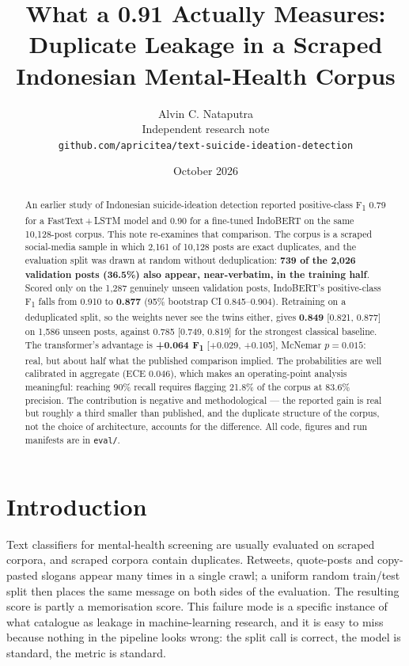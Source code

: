 \documentclass[10pt,a4paper]{article}
\title{\vspace{-2.2em}What a 0.91 \fone{} Actually Measures:\\Duplicate Leakage in a Scraped Indonesian Mental-Health Corpus}
\author{Alvin C. Nataputra\\
\small Independent research note\\[-0.3em]
\small \texttt{github.com/apricitea/text-suicide-ideation-detection}}
\date{October 2026}
\newcommand{\fone}{F\textsubscript{1}}
\begin{document}
\maketitle

\begin{abstract}
\noindent
An earlier study of Indonesian suicide-ideation detection reported positive-class \fone{} 0.79 for a
FastText\,+\,LSTM model and 0.90 for a fine-tuned IndoBERT on the same 10{,}128-post corpus.
This note re-examines that comparison. The corpus is a scraped social-media sample in which 2{,}161
of 10{,}128 posts are exact duplicates, and the evaluation split was drawn at random without
deduplication: \textbf{739 of the 2{,}026 validation posts (36.5\%) also appear, near-verbatim, in
the training half}. Scored only on the 1{,}287 genuinely unseen validation posts, IndoBERT's
positive-class \fone{} falls from 0.910 to \textbf{0.877} (95\% bootstrap CI 0.845--0.904).
Retraining on a deduplicated split, so the weights never see the twins either, gives
\textbf{0.849} [0.821, 0.877] on 1{,}586 unseen posts, against 0.785 [0.749, 0.819] for the
strongest classical baseline. The transformer's advantage is \textbf{+0.064 \fone}
[+0.029, +0.105], McNemar $p=0.015$: real, but about half what the published comparison implied. The probabilities are well calibrated
in aggregate (ECE 0.046), which makes an operating-point analysis meaningful: reaching 90\% recall
requires flagging 21.8\% of the corpus at 83.6\% precision. The contribution is negative and
methodological --- the reported gain is real but roughly a third smaller than published, and the
duplicate structure of the corpus, not the choice of architecture, accounts for the difference.
All code, figures and run manifests are in \texttt{eval/}.
\end{abstract}

\section{Introduction}

Text classifiers for mental-health screening are usually evaluated on scraped corpora, and
scraped corpora contain duplicates. Retweets, quote-posts and copy-pasted slogans appear many
times in a single crawl; a uniform random train/test split then places the same message on both
sides of the evaluation. The resulting score is partly a memorisation score. This failure mode is
a specific instance of what \citet{kapoor2023leakage} catalogue as leakage in machine-learning
research, and it is easy to miss because nothing in the pipeline looks wrong: the split call is
correct, the model is standard, the metric is standard.
\end{document}
